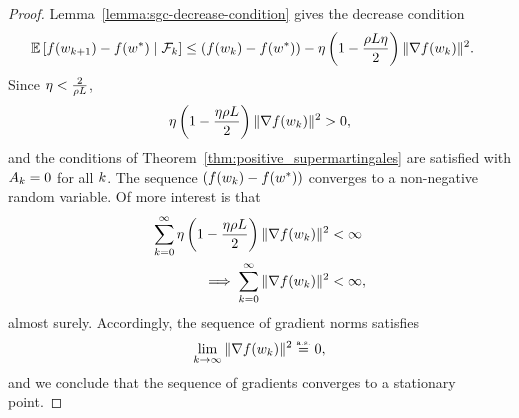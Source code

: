 \sgcAlmostSure*
\begin{proof}
    Lemma~\ref{lemma:sgc-decrease-condition} gives the decrease condition
    \begin{align*}
        \mathbb{E} \left[f(w_{k+1}) - f(w^*) \mid \mathcal{F}_k\right] &\leq \left(f(w_k) - f(w^*)\right) - \eta \left(1 - \frac{\rho L \eta}{2}\right)\|\nabla f(w_k)\|^2.
    \end{align*}
    Since \( \eta < \frac{2}{\rho L} \),
    \begin{align*}
        \eta \left(1 - \frac{\eta \rho L}{2}\right)\|\nabla f(w_k)\|^2 > 0,
    \end{align*}
    and the conditions of Theorem~\ref{thm:positive_supermartingales} are satisfied with \( A_k = 0 \) for all \( k \).
    The sequence \( \left(f(w_k) - f(w^*)\right) \) converges to a non-negative random variable.
    Of more interest is that
    \begin{align}
        \sum_{k=0}^{\infty} \eta \left(1 - \frac{\eta \rho L}{2}\right) \|\nabla f(w_k)\|^2 &< \infty \nonumber\\
        \implies \sum_{k=0}^{\infty} \|\nabla f(w_k)\|^2 &< \infty, \label{eq:stationary-convergence}
    \end{align}
    almost surely.
    Accordingly, the sequence of gradient norms satisfies
    \[ \lim_{k \rightarrow \infty} \|\nabla f(w_k)\|^2 \stackrel{\text{\rm\tiny a.s.}}{=} 0, \]
    and we conclude that the sequence of gradients converges to a stationary point.
   

\end{proof}

